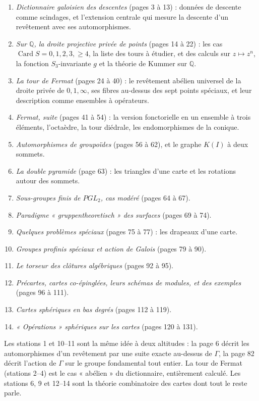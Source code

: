 \documentclass[11pt,a4paper]{article}
\begin{document}
\begin{enumerate}
\item[1.] \emph{Dictionnaire galoisien des descentes} (pages 3 à 13) : données de
descente comme scindages, et l'extension centrale qui mesure la descente d'un
revêtement avec ses automorphismes.
\item[2.] \emph{Sur $\mathbb{Q}$, la droite projective privée de points}
(pages 14 à 22) : les cas $\operatorname{Card} S = 0, 1, 2, 3, \geqslant 4$, la
liste des tours à étudier, et des calculs sur $z \mapsto z^{n}$, la fonction
$S_3$-invariante $g$ et la théorie de Kummer sur $\mathbb{Q}$.
\item[3.] \emph{La tour de Fermat} (pages 24 à 40) : le revêtement abélien
universel de la droite privée de $0, 1, \infty$, ses fibres au-dessus des sept
points spéciaux, et leur description comme ensembles à opérateurs.
\item[4.] \emph{Fermat, suite} (pages 41 à 54) : la version fonctorielle en un
ensemble à trois éléments, l'octaèdre, la tour diédrale, les endomorphismes de
la conique.
\item[5.] \emph{Automorphismes de groupoïdes} (pages 56 à 62), et le graphe
$K(I)$ à deux sommets.
\item[6.] \emph{La double pyramide} (page 63) : les triangles d'une carte et
les rotations autour des sommets.
\item[7.] \emph{Sous-groupes finis de $PGL_2$, cas modéré} (pages 64 à 67).
\item[8.] \emph{Paradigme « gruppentheoretisch » des surfaces} (pages 69 à 74).
\item[9.] \emph{Quelques problèmes spéciaux} (pages 75 à 77) : les drapeaux d'une
carte.
\item[10.] \emph{Groupes profinis spéciaux et action de Galois} (pages 79 à 90).
\item[11.] \emph{Le torseur des clôtures algébriques} (pages 92 à 95).
\item[12.] \emph{Précartes, cartes co-épinglées, leurs schémas de modules, et des
exemples} (pages 96 à 111).
\item[13.] \emph{Cartes sphériques en bas degrés} (pages 112 à 119).
\item[14.] \emph{« Opérations » sphériques sur les cartes} (pages 120 à 131).
\end{enumerate}

Les stations 1 et 10--11 sont la même idée à deux altitudes : la page 6
décrit les automorphismes d'un revêtement par une suite exacte au-dessus de
$\Gamma$, la page 82 décrit l'action de $\Gamma$ sur le groupe fondamental tout
entier. La tour de Fermat (stations 2--4) est le cas « abélien » du
dictionnaire, entièrement calculé. Les stations 6, 9 et 12--14 sont la théorie
combinatoire des cartes dont tout le reste parle.
\end{document}
